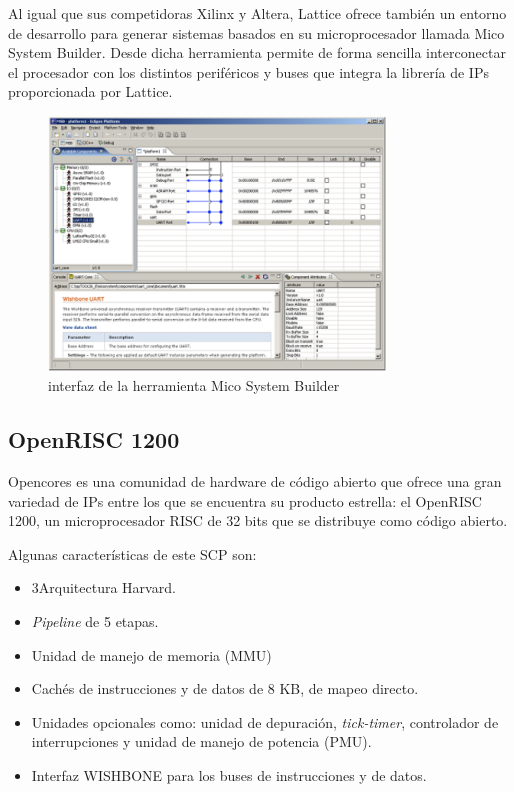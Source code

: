Al igual que sus competidoras Xilinx y Altera, Lattice ofrece también un entorno de desarrollo para generar sistemas basados en su microprocesador
llamada Mico System Builder. Desde dicha herramienta permite de forma sencilla interconectar el procesador con los distintos periféricos y buses que
integra la librería de IPs proporcionada por Lattice.

\begin{figure}[h!]
 	\begin{center}
  	\includegraphics[width=0.8\textwidth,keepaspectratio=true]{./images/herramientaslatice}
  	\caption{interfaz de la herramienta Mico System Builder}
 	\end{center}
	\end{figure}

	\subsection{OpenRISC 1200}

Opencores \cite{Etiqueta20} es una comunidad de hardware de código abierto que ofrece una gran variedad de IPs entre los que se encuentra su producto estrella: el OpenRISC 1200, un microprocesador RISC de 32 bits que se distribuye como código abierto.

Algunas características de este SCP son:

\begin{itemize}
		 \item  3Arquitectura Harvard.
	 	 \item \textit{Pipeline} de 5 etapas.
	 	 \item  Unidad de manejo de memoria (MMU)
		 \item  Cachés de instrucciones y de datos de 8 KB, de mapeo directo.
 		\item Unidades opcionales como: unidad de depuración,\textit{ tick-timer}, controlador de interrupciones y unidad de manejo de potencia (PMU).
		\item Interfaz WISHBONE para los buses de instrucciones y de datos.
\end{itemize}
  
